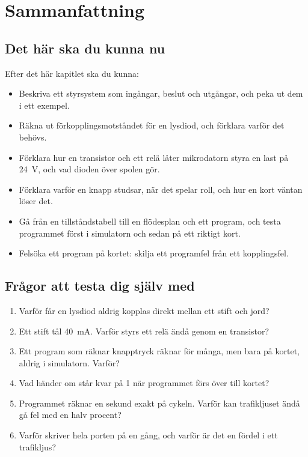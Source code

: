 
\section{Sammanfattning}
\label{c11:sec:summary}

\subsection*{Det här ska du kunna nu}
Efter det här kapitlet ska du kunna:
\begin{itemize}
  \item Beskriva ett styrsystem som ingångar, beslut och utgångar, och peka ut dem i ett exempel.
  \item Räkna ut förkopplingsmotståndet för en lysdiod, och förklara varför det behövs.
  \item Förklara hur en transistor och ett relä låter mikrodatorn styra en last på 24~V, och vad
    dioden över spolen gör.
  \item Förklara varför en knapp studsar, när det spelar roll, och hur en kort väntan löser det.
  \item Gå från en tillståndstabell till en flödesplan och ett program, och testa programmet först
    i simulatorn och sedan på ett riktigt kort.
  \item Felsöka ett program på kortet: skilja ett programfel från ett kopplingsfel.
\end{itemize}

\subsection*{Frågor att testa dig själv med}
\begin{enumerate}
  \item Varför får en lysdiod aldrig kopplas direkt mellan ett stift och jord?
  \item Ett stift tål 40~mA. Varför styrs ett relä ändå genom en transistor?
  \item Ett program som räknar knapptryck räknar för många, men bara på kortet, aldrig i
    simulatorn. Varför?
  \item Vad händer om  står kvar på 1 när programmet förs över till kortet?
  \item Programmet räknar en sekund exakt på cykeln. Varför kan trafikljuset ändå gå fel med en
    halv procent?
  \item Varför skriver  hela porten på en gång, och varför är det en fördel i
    ett trafikljus?
\end{enumerate}

